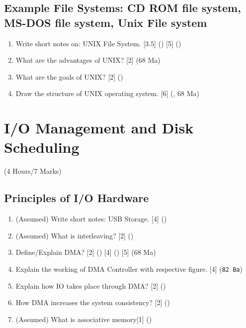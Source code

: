 \documentclass[12pt]{article}
\begin{document}
	\subsection{Example File Systems: CD ROM file system, MS-DOS file system, Unix File system}
		\begin{enumerate}[noitemsep, topsep=0pt]
			\item Write short notes on: UNIX File System. \hfill [3.5] () [5] ()

			\item What are the advantages of UNIX? \hfill [2] (68 Ma)

			\item What are the goals of UNIX? \hfill [2] ()

			\item Draw the structure of UNIX operating system. \hfill [6] (, 68 Ma)
		\end{enumerate}

	\pagebreak

\section{I/O Management and Disk Scheduling}
	\begin{center}(4 Hours/7 Marks)\end{center}
	\subsection{Principles of I/O Hardware}
		\begin{enumerate}[noitemsep, topsep=0pt]
			\item (Assumed) Write short notes: USB Storage. \hfill [4] ()

			\item (Assumed) What is interleaving? \hfill [2] ()
			
			\item Define/Explain DMA? \hfill [2] () [4] () [5] (68 Ma)
			
			\item Explain the working of DMA Controller with respective figure. \hfill [4] (\texttt{82 Ba})

			\item Explain how IO takes place through DMA? \hfill [2] ()

			\item How DMA increases the system consistency? \hfill [2] ()

			\item (Assumed) What is associative memory\hfill [1] ()
		\end{enumerate}
\end{document}
